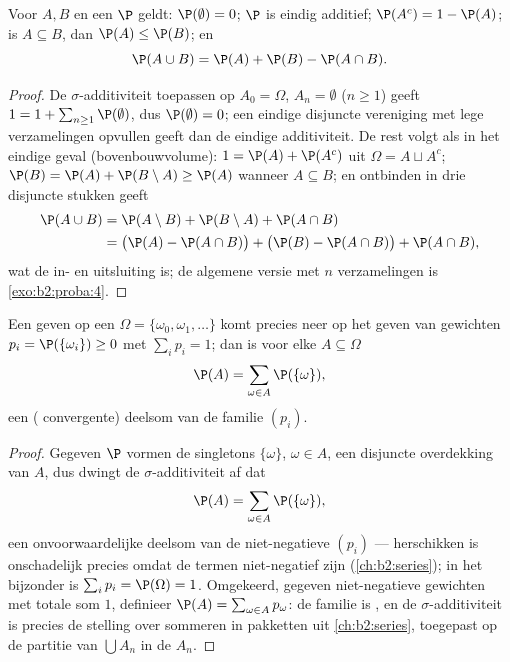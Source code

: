 \begin{proposition}\label{prop:b2:proba:rules}
Voor  $A, B$ en een  $\P$ geldt:
$\P(\emptyset) = 0$; $\P$ is eindig additief; $\P(A^c) = 1 -
\P(A)$; is $A \subseteq B$, dan $\P(A) \leq \P(B)$; en
\[
\P(A \cup B) = \P(A) + \P(B) - \P(A \cap B) .
\]
\end{proposition}

\begin{proof}
De $\sigma$-additiviteit toepassen op $A_0 = \Omega$, $A_n =
\emptyset$ ($n \geq 1$) geeft $1 = 1 +
\sum_{n\geq1}\P(\emptyset)$, dus $\P(\emptyset) = 0$; een eindige
disjuncte vereniging met lege verzamelingen opvullen geeft dan de
eindige additiviteit. De rest volgt als in het eindige geval
(bovenbouwvolume): $1 = \P(A) + \P(A^c)$ uit $\Omega = A \sqcup
A^c$; $\P(B) = \P(A) + \P(B \setminus A) \geq \P(A)$ wanneer $A
\subseteq B$; en ontbinden in drie disjuncte stukken geeft
\begin{align*}
\P(A \cup B) &= \P(A \setminus B) + \P(B \setminus A) +
\P(A \cap B)\\
&= \bigl(\P(A) - \P(A\cap B)\bigr) + \bigl(\P(B) - \P(A\cap
B)\bigr) + \P(A \cap B),
\end{align*}
wat de in- en uitsluiting is; de algemene versie met $n$
verzamelingen is \cref{exo:b2:proba:4}.
\end{proof}

\begin{proposition}\label{prop:b2:proba:distribution}
Een  geven op een  $\Omega = \{\omega_0,
\omega_1, \dots\}$ komt precies neer op het geven van gewichten
$p_i = \P(\{\omega_i\}) \geq 0$ met $\sum_i p_i = 1$; dan is voor
elke $A \subseteq \Omega$
\[
\P(A) = \sum_{\omega \in A} \P(\{\omega\}) ,
\]
een ( convergente) deelsom van de familie $(p_i)$.
\end{proposition}

\begin{proof}
Gegeven $\P$ vormen de singletons $\{\omega\}$, $\omega \in A$, een
 disjuncte overdekking van $A$, dus dwingt de
$\sigma$-additiviteit af dat
\[
\P(A) = \sum_{\omega\in A}\P(\{\omega\}),
\]
een onvoorwaardelijke deelsom van de niet-negatieve  $(p_i)$ --- herschikken is onschadelijk precies omdat de
termen niet-negatief zijn (\cref{ch:b2:series}); in het bijzonder
is $\sum_ip_i = \P(\Omega) = 1$. Omgekeerd, gegeven niet-negatieve
gewichten met totale som $1$, definieer $\P(A) = \sum_{\omega \in
A}p_\omega$: de familie is , en de
$\sigma$-additiviteit is precies de stelling over sommeren in
pakketten uit \cref{ch:b2:series}, toegepast op de partitie van
$\bigcup A_n$ in de $A_n$.
\end{proof}

